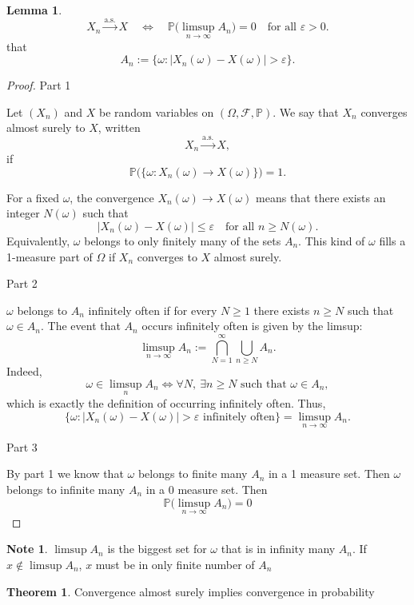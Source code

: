 \documentclass[11pt]{article}
\theoremstyle{definition}
\newtheorem{note}{Note}[section]
\newtheorem{lemma}{Lemma}[section]
\newtheorem{theo}{Theorem}[section]
\begin{document}
\begin{lemma}
\[
X_n \xrightarrow{\text{a.s.}} X
\quad \Longleftrightarrow \quad
\mathbb P\big(\limsup_{n\to\infty} A_n\big)=0
\quad \text{for all } \varepsilon>0.
\]
that
\[
A_n := \{\omega : |X_n(\omega)-X(\omega)|>\varepsilon\}.
\]
\end{lemma}

\begin{proof}

Part 1

Let $(X_n)$ and $X$ be random variables on $(\Omega,\mathcal F,\mathbb P)$.
We say that $X_n$ converges almost surely to $X$, written
\[
X_n \xrightarrow{\text{a.s.}} X,
\]
if
\[
\mathbb P\big(\{\omega : X_n(\omega)\to X(\omega)\}\big)=1.
\]

For a fixed $\omega$, the convergence $X_n(\omega)\to X(\omega)$ means that
there exists an integer $N(\omega)$ such that
\[
|X_n(\omega)-X(\omega)|\le\varepsilon
\quad \text{for all } n\ge N(\omega).
\]
Equivalently, $\omega$ belongs to only finitely many of the sets $A_n$. This kind of $\omega$ fills a 1-measure part of $\Omega$ if $X_n$ converges to $X$ almost surely.

Part 2

$\omega$ belongs to $A_n$ infinitely often if
for every $N\ge1$ there exists $n\ge N$ such that $\omega\in A_n$.
The event that $A_n$ occurs infinitely often is given by the limsup:
\[
\limsup_{n\to\infty} A_n
:=
\bigcap_{N=1}^\infty \bigcup_{n\ge N} A_n.
\]
Indeed,
\[
\omega\in\limsup_{n} A_n
\iff
\forall N,\ \exists n\ge N \text{ such that } \omega\in A_n,
\]
which is exactly the definition of occurring infinitely often. Thus,
\[
\{\omega : |X_n(\omega)-X(\omega)|>\varepsilon \text{ infinitely often}\}
=
\limsup_{n\to\infty} A_n.
\]

Part 3

By part 1 we know that $\omega$ belongs to finite many $A_n$ in a 1 measure set. Then $\omega$ belongs to infinite many $A_n$ in a 0 measure set. Then
\[
\mathbb P\big(\limsup_{n\to\infty} A_n\big)=0
\]
\end{proof}

\begin{note} 
$\limsup A_n$ is the biggest set for $\omega$ that is in infinity many $A_n$. If $x\notin\limsup A_n$, $x$ must be in only finite number of $A_n$
\end{note} 


\begin{theo} 
Convergence almost surely implies convergence in probability
\end{theo} 
\end{document}
